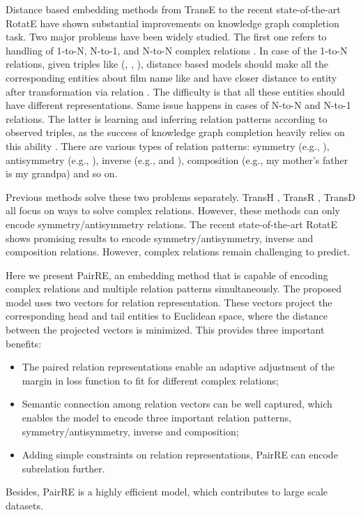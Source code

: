 \documentclass[11pt,a4paper]{article}
\begin{document}
Distance based embedding methods from TransE \cite{bordes2013translating} to the recent state-of-the-art RotatE \cite{sun2019rotate} have shown substantial improvements on knowledge graph completion task. Two major problems have been widely studied.
{The first one refers to handling of 1-to-N, N-to-1, and N-to-N complex relations \cite{bordes2013translating, lin2015learning}}.
In case of the 1-to-N relations, given triples like (, , ), distance based models should make all the corresponding entities about film name like  and  have closer distance to entity  after transformation via relation . 
The difficulty is that all these entities should have different representations. Same issue happens in cases of N-to-N and N-to-1 relations. 
{The latter is learning and inferring relation patterns according to observed triples, as the success of knowledge graph completion heavily relies on this ability \cite{bordes2013translating, sun2019rotate}}.
There are various types of relation patterns: symmetry (e.g., ), antisymmetry (e.g., ), inverse (e.g.,  and ), composition (e.g., my mother’s father is my grandpa) and so on. 

Previous methods solve these two problems separately.
TransH \cite{wang2014knowledge}, TransR \cite{lin2015learning}, TransD \cite{ji2015knowledge} all focus on ways to solve complex relations.
However, these methods can only encode symmetry/antisymmetry relations.
The recent state-of-the-art RotatE shows promising results to encode symmetry/antisymmetry, inverse and composition relations.
However, complex relations remain challenging to predict.

Here we present PairRE, an embedding method that is capable of encoding complex relations and multiple relation patterns simultaneously. The proposed model uses two vectors for relation representation. These vectors project the corresponding head and tail entities to Euclidean space, where the distance between the projected vectors is minimized.
This provides three important benefits:
\begin{itemize}
\item[]
The paired relation representations enable an adaptive adjustment of the margin in loss function to fit for different complex relations;
\end{itemize}
\begin{itemize}
\item[]
Semantic connection among relation vectors can be well captured, which enables the model to encode three important relation patterns, symmetry/antisymmetry, inverse and composition;
\end{itemize}
\begin{itemize}
\item[]
Adding simple constraints on relation representations, PairRE can encode subrelation further.
\end{itemize}
Besides, PairRE is a highly efficient model, which contributes to large scale datasets.
\end{document}
